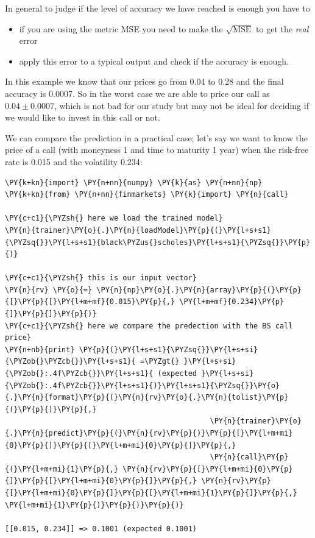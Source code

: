 In general to judge if the level of accuracy we have reached is enough
you have to

\begin{itemize}
	\tightlist
	\item
	if you are using the metric MSE you need to make the
	\(\sqrt{\mathrm{MSE}}\) to get the \emph{real} error
	\item
	apply this error to a typical output and check if the accuracy is
	enough.
\end{itemize}

In this example we know that our prices go from 0.04 to 0.28 and the
final accuracy is 0.0007. So in the
worst case we are able to price our call as \(0.04 \pm 0.0007\), which
is not bad for our study but may not be ideal for deciding if we would
like to invest in this call or not.

We can compare the prediction in a practical case; let's say we
want to know the price of a call (with moneyness 1 and time to maturity
1 year) when the risk-free rate is 0.015 and the volatility 0.234:

\begin{codebox}[breakable, size=fbox, boxrule=1pt, pad at break*=1mm,colback=cellbackground, colframe=cellborder]
\begin{Verbatim}[commandchars=\\\{\}]
\PY{k+kn}{import} \PY{n+nn}{numpy} \PY{k}{as} \PY{n+nn}{np}
\PY{k+kn}{from} \PY{n+nn}{finmarkets} \PY{k}{import} \PY{n}{call}
	
\PY{c+c1}{\PYZsh{} here we load the trained model}
\PY{n}{trainer}\PY{o}{.}\PY{n}{loadModel}\PY{p}{(}\PY{l+s+s1}{\PYZsq{}}\PY{l+s+s1}{black\PYZus{}scholes}\PY{l+s+s1}{\PYZsq{}}\PY{p}{)}
	
\PY{c+c1}{\PYZsh{} this is our input vector}
\PY{n}{rv} \PY{o}{=} \PY{n}{np}\PY{o}{.}\PY{n}{array}\PY{p}{(}\PY{p}{[}\PY{p}{[}\PY{l+m+mf}{0.015}\PY{p}{,} \PY{l+m+mf}{0.234}\PY{p}{]}\PY{p}{]}\PY{p}{)}
\PY{c+c1}{\PYZsh{} here we compare the predection with the BS call price}
\PY{n+nb}{print} \PY{p}{(}\PY{l+s+s1}{\PYZsq{}}\PY{l+s+si}{\PYZob{}\PYZcb{}}\PY{l+s+s1}{ =\PYZgt{} }\PY{l+s+si}{\PYZob{}:.4f\PYZcb{}}\PY{l+s+s1}{ (expected }\PY{l+s+si}{\PYZob{}:.4f\PYZcb{}}\PY{l+s+s1}{)}\PY{l+s+s1}{\PYZsq{}}\PY{o}{.}\PY{n}{format}\PY{p}{(}\PY{n}{rv}\PY{o}{.}\PY{n}{tolist}\PY{p}{(}\PY{p}{)}\PY{p}{,} 
                                               \PY{n}{trainer}\PY{o}{.}\PY{n}{predict}\PY{p}{(}\PY{n}{rv}\PY{p}{)}\PY{p}{[}\PY{l+m+mi}{0}\PY{p}{]}\PY{p}{[}\PY{l+m+mi}{0}\PY{p}{]}\PY{p}{,} 
                                               \PY{n}{call}\PY{p}{(}\PY{l+m+mi}{1}\PY{p}{,} \PY{n}{rv}\PY{p}{[}\PY{l+m+mi}{0}\PY{p}{]}\PY{p}{[}\PY{l+m+mi}{0}\PY{p}{]}\PY{p}{,} \PY{n}{rv}\PY{p}{[}\PY{l+m+mi}{0}\PY{p}{]}\PY{p}{[}\PY{l+m+mi}{1}\PY{p}{]}\PY{p}{,} \PY{l+m+mi}{1}\PY{p}{)}\PY{p}{)}\PY{p}{)}

[[0.015, 0.234]] => 0.1001 (expected 0.1001)
\end{Verbatim}
\end{codebox}

